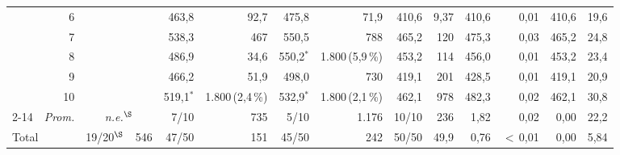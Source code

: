 \documentclass[11pt,a4paper]{article}
\begin{document}
\begin{table}[htbp]
{\begin{tabular}{rr rr rr rr rr rr rr}
 & 6 &  &  & 463{,}8 & 92{,}7 & 475{,}8 & 71{,}9 & 410{,}6 & 9{,}37 & 410{,}6 & 0{,}01 & 410{,}6 & 19{,}6 \\
 & 7 &  &  & 538{,}3 & 467 & 550{,}5 & 788 & 465{,}2 & 120 & 475{,}3 & 0{,}03 & 465{,}2 & 24{,}8 \\
 & 8 &  &  & 486{,}9 & 34{,}6 & 550{,}2$^{*}$ & 1.800\,{\scriptsize(5{,}9\,\%)} & 453{,}2 & 114 & 456{,}0 & 0{,}01 & 453{,}2 & 23{,}4 \\
 & 9 &  &  & 466{,}2 & 51{,}9 & 498{,}0 & 730 & 419{,}1 & 201 & 428{,}5 & 0{,}01 & 419{,}1 & 20{,}9 \\
 & 10 &  &  & 519{,}1$^{*}$ & 1.800\,{\scriptsize(2{,}4\,\%)} & 532{,}9$^{*}$ & 1.800\,{\scriptsize(2{,}1\,\%)} & 462{,}1 & 978 & 482{,}3 & 0{,}02 & 462{,}1 & 30{,}8 \\
\cmidrule(l){2-14}
 & \emph{Prom.} & \multicolumn{2}{c}{\textit{n.e.}$^{\S}$} & 7/10 & 735 & 5/10 & 1.176 & 10/10 & 236 & 1{,}82 & 0{,}02 & 0{,}00 & 22{,}2 \\
\midrule
\multicolumn{2}{l}{Total} & 19/20$^{\S}$ & 546 & 47/50 & 151 & 45/50 & 242 & 50/50 & 49{,}9 & 0{,}76 & $<$\,0{,}01 & 0{,}00 & 5{,}84 \\
\bottomrule
\end{tabular}%
}
\end{table}
\end{document}
